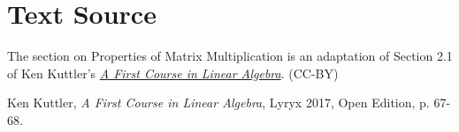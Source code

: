 \documentclass{ximera}
\begin{document}
\section*{Text Source}
The section on Properties of Matrix Multiplication is an adaptation of Section 2.1 of Ken Kuttler's \href{https://open.umn.edu/opentextbooks/textbooks/a-first-course-in-linear-algebra-2017}{\it A First Course in Linear Algebra}. (CC-BY)

Ken Kuttler, {\it  A First Course in Linear Algebra}, Lyryx 2017, Open Edition, p. 67-68.
\end{document}
